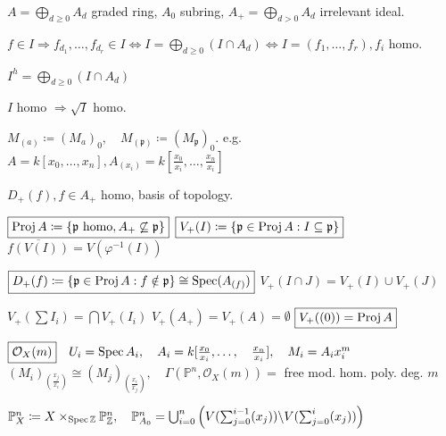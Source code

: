 $A = \bigoplus_{d \geq 0} A_d$ graded ring, $A_0$ subring, $A_+ = \bigoplus_{d >0} A_d$ irrelevant ideal.

\begin{definition} 
$f \in I \Rightarrow f_{d_1}, \ldots, f_{d_r} \in I \Leftrightarrow  I = \bigoplus_{d \geq 0} (I \cap A_d) \Leftrightarrow I = (f_1, \ldots, f_r), f_i$ homo.
\end{definition}

\begin{definition}[Homogenization]
$I ^{h} = \bigoplus_{d \geq 0} (I \cap A_d)$
\end{definition}

\begin{proposition}
$I$ homo $ \Rightarrow \sqrt{I}$ homo.
\end{proposition}

\begin{definition}
$M_{(a)} \coloneqq (M_a)_0, \quad  M_{(\mathfrak{p})} \coloneqq (M_{\mathfrak{p}})_0$. e.g. $A = k[x_0, \ldots, x_n], A_{(x_i)} = k[\frac{x_0}{x_i}, \ldots, \frac{x_n}{x_i}]$
\end{definition}

\begin{proposition}
$D_+(f), f \in A_+$ homo, basis of topology.
\end{proposition}

$\boxed{\operatorname{Proj} A \coloneqq \{ \mathfrak{p} \text{ homo}, A_+ \not\subseteq \mathfrak{p} \}} $
$\boxed{V_+(I) \coloneqq \{ \mathfrak{p} \in \operatorname{Proj} A : I \subseteq \mathfrak{p} \}} $
$\boxed{\overline{f(V(I))} = V(\varphi ^{-1}(I))} $

$\boxed{ D_+(f) \coloneqq \{ \mathfrak{p} \in \operatorname{Proj} A : f \notin \mathfrak{p} \} \cong \operatorname{Spec} (A_{(f)}) }$
$\boxed{ V_+(I \cap J) = V_+(I) \cup V_+(J)}$

$\boxed{V_+(\sum I_i) = \bigcap V_+(I_i)}$
$\boxed{V_+(A_+) = V_+(A) = \emptyset} $
$\boxed{V_+((0)) = \operatorname{Proj} A}$

\begin{proposition} $\boxed{\mathcal{O}_X(m)} \quad U_i = \operatorname{Spec} A_i, \quad  A_i = k[\frac{x_0}{x_i}, \ldots, \quad  \frac{x_n}{x_i}], \quad  M_i = A_ix_i^m $ \\
$(M_i) _{(\frac{x_j}{x_i})} \cong (M_j)_{(\frac{x_i}{x_j})}, \quad \Gamma (\mathbb{P}^n, \mathcal{O}_X(m)) =$ free mod. hom. poly. deg. $m$
\end{proposition}

\begin{definition}
$\mathbb{P}^n_X \coloneqq X \times_{\operatorname{Spec} \mathbb{Z}} \mathbb{P}^n_{\mathbb{Z}}, \quad \mathbb{P}^{n}_{A_0} = \bigcup_{i=0}^n \left( V(\sum_{j=0}^{i-1} (x_j)) \backslash V(\sum_{j=0}^{i} (x_j)) \right)$
\end{definition}

